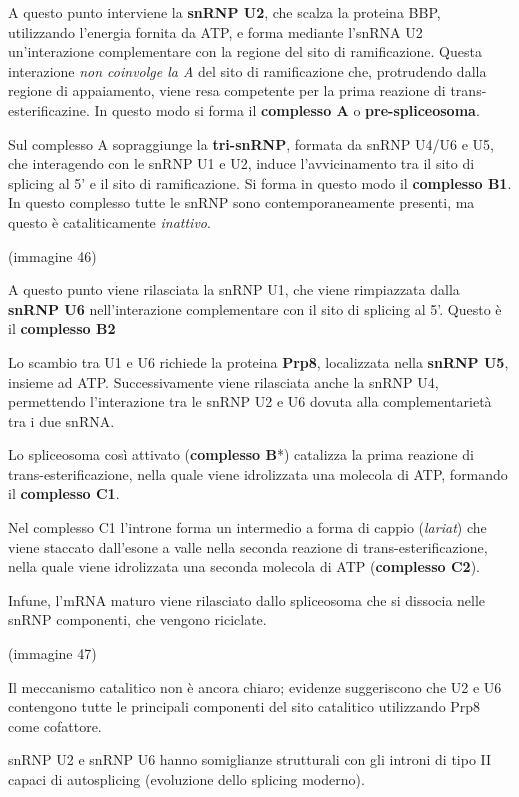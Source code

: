 \documentclass[11pt]{book}
\begin{document}
A questo punto interviene la \textbf{snRNP U2}, che scalza la proteina
BBP, utilizzando l'energia fornita da ATP, e forma mediante l'snRNA U2
un'interazione complementare con la regione del sito di ramificazione.
Questa interazione \emph{non coinvolge la A} del sito di ramificazione
che, protrudendo dalla regione di appaiamento, viene resa competente per
la prima reazione di trans-esterificazine. In questo modo si forma il
\textbf{complesso A} o \textbf{pre-spliceosoma}.

Sul complesso A sopraggiunge la \textbf{tri-snRNP}, formata da snRNP
U4/U6 e U5, che interagendo con le snRNP U1 e U2, induce l'avvicinamento
tra il sito di splicing al 5' e il sito di ramificazione. Si forma in
questo modo il \textbf{complesso B1}. In questo complesso tutte le snRNP
sono contemporaneamente presenti, ma questo è cataliticamente
\emph{inattivo}.

(immagine 46)

A questo punto viene rilasciata la snRNP U1, che viene rimpiazzata dalla
\textbf{snRNP U6} nell'interazione complementare con il sito di splicing
al 5'. Questo è il \textbf{complesso B2}

Lo scambio tra U1 e U6 richiede la proteina \textbf{Prp8}, localizzata
nella \textbf{snRNP U5}, insieme ad ATP. Successivamente viene
rilasciata anche la snRNP U4, permettendo l'interazione tra le snRNP U2
e U6 dovuta alla complementarietà tra i due snRNA.

Lo spliceosoma così attivato (\textbf{complesso B}*) catalizza la prima
reazione di trans-esterificazione, nella quale viene idrolizzata una
molecola di ATP, formando il \textbf{complesso C1}.

Nel complesso C1 l'introne forma un intermedio a forma di cappio
(\emph{lariat}) che viene staccato dall'esone a valle nella seconda
reazione di trans-esterificazione, nella quale viene idrolizzata una
seconda molecola di ATP (\textbf{complesso C2}).

Infune, l'mRNA maturo viene rilasciato dallo spliceosoma che si dissocia
nelle snRNP componenti, che vengono riciclate.

(immagine 47)

Il meccanismo catalitico non è ancora chiaro; evidenze suggeriscono che
U2 e U6 contengono tutte le principali componenti del sito catalitico
utilizzando Prp8 come cofattore.

snRNP U2 e snRNP U6 hanno somiglianze strutturali con gli introni di
tipo II capaci di autosplicing (evoluzione dello splicing moderno).
\end{document}
